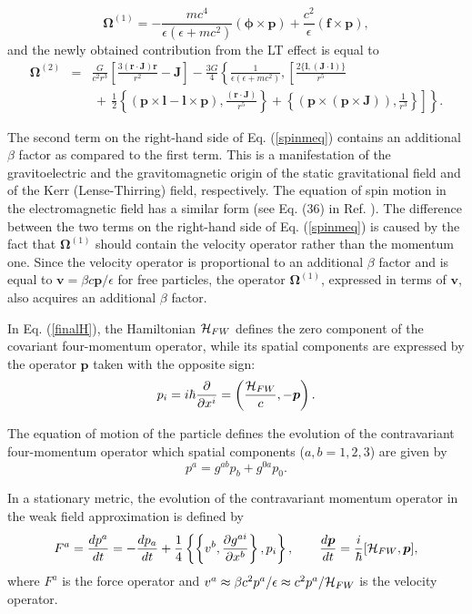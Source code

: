 \documentclass[preprint,showpacs,preprintnumbers,amsmath,amssymb]{revtex4}
\begin{document}
\begin{equation}
\bm\Omega^{(1)}=-\frac{mc^4}{\epsilon (\epsilon
+mc^2)}\left(\bm\phi\times\bm
p\right)+\frac{c^2}{\epsilon}\left(\bm f\times\bm
p\right),\label{eqol}
\end{equation}
and the newly obtained contribution from the LT effect is equal to
\begin{eqnarray}
\bm\Omega^{(2)} &=& \frac{G}{c^2r^3} \left[\frac{3(\bm r\cdot\bm
J)\bm r} {r^2} - \bm J\right]
-\frac{3G}{4}\left\{\frac{1}{\epsilon (\epsilon +
mc^2)},\left[\frac{2\{\bm l,(\bm J\cdot\bm l)\}}{r^5}
\right.\right.\nonumber\\
&& \left.\left. \,+\,\frac{1}{2}\left\{(\bm p\times\bm l - \bm l
\times\bm p), \frac{(\bm r\cdot\bm J)}{r^5}\right\} + \left\{(\bm
p \times(\bm p \times\bm J)),\frac{1}{r^3}\right\}\right]\right\}.
\label{finalOmega}
\end{eqnarray}

The second term on the right-hand side of Eq. (\ref{spinmeq}) contains
an additional $\beta$ factor as compared to the first term. This
is a manifestation of the gravitoelectric and the gravitomagnetic
origin of the static gravitational field and of the Kerr (Lense-Thirring)
field, respectively. The equation of spin motion in the electromagnetic
field has a similar form (see Eq. (36) in Ref. \cite{PRD}). The difference
between the two terms on the right-hand side of Eq. (\ref{spinmeq}) is
caused by the fact that $\bm\Omega^{(1)}$ should contain the velocity
operator rather than the momentum one. Since the velocity operator is
proportional to an additional $\beta$ factor and is equal to $\bm v
= \beta c\bm p/\epsilon$ for free particles, the operator $\bm\Omega^{(1)}$,
expressed in terms of $\bm v$, also acquires an additional $\beta$
factor.

In Eq. (\ref{finalH}), the Hamiltonian ${\cal H}_{FW}$ defines the
zero component of the covariant four-momentum operator, while its
spatial components are expressed by the operator $\bm p$ taken
with the opposite sign:
$$p_i=i\hbar\frac{\partial}{\partial x^i}=
\left(\frac{{\cal H}_{FW}}{c},-\bm p\right).$$

The equation of motion of the particle defines the evolution of
the contravariant four-momentum operator which spatial components
($a,b=1,2,3$) are given by
$$p^a = g^{ab}p_b + g^{0a}p_0.$$

In a stationary metric, the evolution of the contravariant
momentum operator in the weak field approximation is defined by
\begin{eqnarray}
F^a=\frac{dp^a}{dt}=-\frac{dp_a}{dt}+\frac14\left\{\left\{v^b,
\frac{\partial g^{ai}}{\partial x^b}\right\},p_i\right\},\qquad
\frac{d\bm p}{dt}=\frac{i}{\hbar}[{\cal H}_{FW},\bm p],
\label{eqFi}\end{eqnarray} where $F^a$ is the force operator and
$v^a\approx\beta c^2p^a/\epsilon \approx c^2p^a/{\cal H}_{FW}$ is
the velocity operator.
\end{document}
